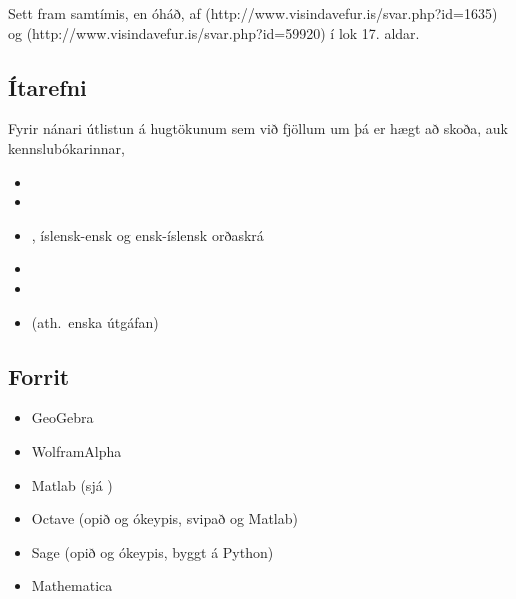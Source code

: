 \documentclass[b5paper,10pt,icelandic]{sphinxmanual}
\begin{document}
Sett fram samtímis, en óháð, af
 (http://www.visindavefur.is/svar.php?id=1635) og
 (http://www.visindavefur.is/svar.php?id=59920) í lok 17. aldar.



\subsection{Ítarefni}
\label{\detokenize{kafli01:itarefni}}
Fyrir nánari útlistun á hugtökunum sem við fjöllum um þá er hægt að skoða,
auk kennslubókarinnar,
\begin{itemize}
\item {} 

\item {} 

\item {} 
, íslensk-ensk og ensk-íslensk orðaskrá

\item {} 

\item {} 

\item {} 
 (ath. enska útgáfan)

\end{itemize}


\subsection{Forrit}
\label{\detokenize{kafli01:forrit}}\begin{itemize}
\item {} 
GeoGebra 

\item {} 
WolframAlpha 

\item {} 
Matlab 
(sjá )

\item {} 
Octave  (opið og ókeypis, svipað og Matlab)

\item {} 
Sage   (opið og ókeypis, byggt á Python)

\item {} 
Mathematica 

\end{itemize}
\end{document}
